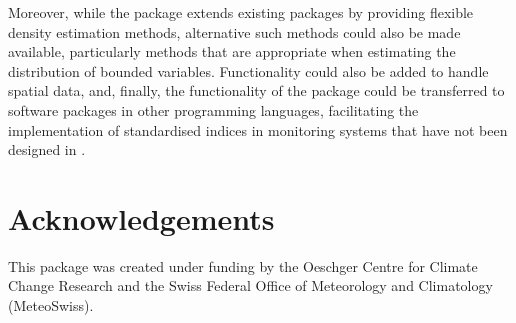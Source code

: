\documentclass[article,shortnames,nojss]{jss}\usepackage[]{graphicx}\usepackage[]{xcolor}
\begin{document}
Moreover, while the package extends existing packages by providing flexible density estimation methods, alternative such methods could also be made available, particularly methods that are appropriate when estimating the distribution of bounded variables. Functionality could also be added to handle spatial data, and, finally, the functionality of the package could be transferred to software packages in other programming languages, facilitating the implementation of standardised indices in monitoring systems that have not been designed in .

\section*{Acknowledgements}

This package was created under funding by the Oeschger Centre for Climate Change Research and the Swiss Federal Office of Meteorology and Climatology (MeteoSwiss).


\end{document}
